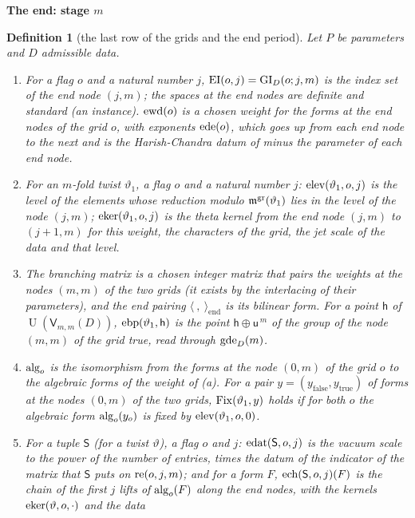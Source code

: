 \documentclass[11pt,a4paper]{article}
\newcommand{\kw}[1]{\emph{#1}}
\newcommand{\sect}[2]{\refstepcounter{section}\label{#2}\par\addvspace{19pt plus 4pt minus 2pt}\Needspace{7\baselineskip}%
  \noindent\llap{{\fontsize{13.2}{16}\selectfont\bfseries\color{inkfaint}\thesection}\hspace{9pt}}%
  {\fontsize{13.2}{16}\selectfont\bfseries\color{ink}#1}\par\nopagebreak\vspace{-1pt}}
\theoremstyle{plainx}
\theoremstyle{uprightx}
\newtheorem{definition}[theorem]{Definition}
\newcommand{\sS}{\mathsf{S}}
\newcommand{\sV}{\mathsf{V}}
\newcommand{\sh}{\mathsf{h}}
\newcommand{\su}{\mathsf{u}}
\newcommand{\U}{\operatorname{U}}
\begin{document}
\sect{The end: stage $m$}{s:end}
\begin{definition}[the last row of the grids and the end period]\label{d:end}
Let $P$ be parameters and $D$ admissible data.
\begin{enumerate}[label=\textup{(\alph*)},leftmargin=2.3em,itemsep=1pt]
\item For a flag $o$ and a natural number $j$, $\operatorname{EI}(o,j)=\operatorname{GI}_{D}(o;j,m)$ is the index set of the
\kw{end node} $(j,m)$; the spaces at the end nodes are definite and standard (an instance). $\operatorname{ewd}(o)$
is a chosen weight for the forms at the end nodes of the grid $o$, with exponents $\operatorname{ede}(o)$, which goes up
from each end node to the next and is the Harish-Chandra datum of minus the parameter of each end node.
\item For an $m$-fold twist $\vartheta_1$, a flag $o$ and a natural number $j$: $\operatorname{elev}(\vartheta_1,o,j)$ is
the level of the elements whose reduction modulo $\mathfrak{m}^{\mathrm{gr}}(\vartheta_1)$ lies in the level of the node
$(j,m)$; $\operatorname{eker}(\vartheta_1,o,j)$ is the theta kernel from the end node $(j,m)$ to $(j+1,m)$ for this
weight, the characters of the grid, the jet scale of the data and that level.
\item The \kw{branching matrix} is a chosen integer matrix that pairs the weights at the nodes $(m,m)$ of the two
grids (it exists by the interlacing of their parameters), and the \kw{end pairing}
$\langle\ ,\ \rangle_{\mathrm{end}}$ is its bilinear form. For a point $\sh$ of $\U(\sV_{m,m}(D))$,
$\finBlockPoint{\vartheta_1}{\sh}$ is the point $\sh\oplus\su^{\,m}$ of the group of the node $(m,m)$ of the grid
true, read through $\operatorname{gde}_{D}(m)$.
\item $\operatorname{alg}_{o}$ is the isomorphism from the forms at the node $(0,m)$ of the grid $o$ to the algebraic
forms of the weight of \textup{(a)}. For a pair $y=(y_{\mathrm{false}},y_{\mathrm{true}})$ of forms at the nodes
$(0,m)$ of the two grids, $\operatorname{Fix}(\vartheta_1,y)$ holds if for both $o$ the algebraic form
$\operatorname{alg}_{o}(y_o)$ is fixed by $\operatorname{elev}(\vartheta_1,o,0)$.
\item For a tuple $\sS$ (for a twist $\vartheta$), a flag $o$ and $j$: $\finDatum{\sS}{o}{j}$ is the vacuum scale
to the power of the number of entries, times the datum of the indicator of the matrix that $\sS$ puts on
$\operatorname{re}(o,j,m)$; and for a form $F$, $\finChain{\sS}{o}{j}{F}$ is the chain of the first $j$ lifts of
$\operatorname{alg}_{o}(F)$ along the end nodes, with the kernels $\operatorname{eker}(\vartheta,o,\cdot)$ and the data

\end{enumerate}
\end{definition}
\end{document}
